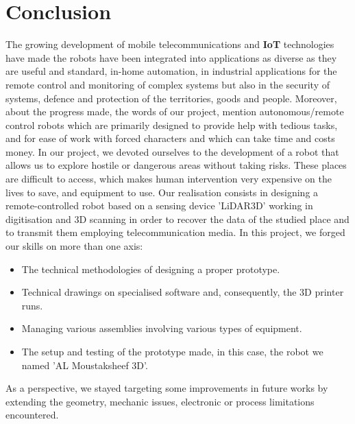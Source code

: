 \documentclass[Afour,sageh,times]{sagej}
\begin{document}
\section{Conclusion}
The growing development of mobile telecommunications and \textbf{IoT} technologies have made the robots have been integrated into applications as diverse as they are useful and standard, in-home automation, in industrial applications for the remote control and monitoring of complex systems but also in the security of systems, defence and protection of the territories, goods and people. Moreover, about the progress made, the words of our project, mention autonomous/remote control robots which are primarily designed to provide help with tedious tasks, and for ease of work with forced characters and which can take time and costs money.\newline
In our project, we devoted ourselves to the development of a robot that allows us to explore hostile or dangerous areas without taking risks. These places are difficult to access, which makes human intervention very expensive on the lives to save, and equipment to use.
Our realisation consists in designing a remote-controlled robot based on a sensing device 'LiDAR3D' working in digitisation and 3D scanning in order to recover the data of the studied place and to transmit them employing telecommunication media.\newline
In this project, we forged our skills on more than one axis:

\begin{itemize}
    \item The technical methodologies of designing a proper prototype.
    \item Technical drawings on specialised software and, consequently, the 3D printer runs.
    \item Managing various assemblies involving various types of equipment.
    \item The setup and testing of the prototype made, in this case, the robot we named 'AL Moustaksheef 3D'.
\end{itemize}
As a perspective, we stayed targeting some improvements in future works by extending the geometry, mechanic issues, electronic or process limitations encountered.



\end{document}
